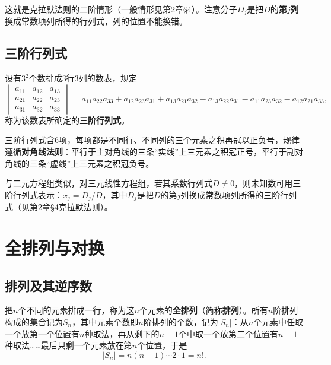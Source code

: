 
这就是克拉默法则的二阶情形（一般情形见第2章§4）。注意分子$D_j$是把$D$的\textbf{第$j$列}换成常数项列所得的行列式，列的位置不能换错。

\subsection{三阶行列式}

\begin{definition}
设有$3^2$个数排成3行3列的数表，规定
\[
\begin{vmatrix}
a_{11}&a_{12}&a_{13}\\
a_{21}&a_{22}&a_{23}\\
a_{31}&a_{32}&a_{33}
\end{vmatrix}
=a_{11}a_{22}a_{33}+a_{12}a_{23}a_{31}+a_{13}a_{21}a_{32}
-a_{13}a_{22}a_{31}-a_{11}a_{23}a_{32}-a_{12}a_{21}a_{33},
\]
称为该数表所确定的\textbf{三阶行列式}。
\end{definition}

三阶行列式含$6$项，每项都是不同行、不同列的三个元素之积再冠以正负号，规律遵循\textbf{对角线法则}：平行于主对角线的三条“实线”上三元素之积冠正号，平行于副对角线的三条“虚线”上三元素之积冠负号。


与二元方程组类似，对三元线性方程组，若其系数行列式$D\neq0$，则未知数可用三阶行列式表示：$x_j=D_j/D$，其中$D_j$是把$D$的第$j$列换成常数项列所得的三阶行列式（见第2章§4克拉默法则）。

\section{全排列与对换}

\subsection{排列及其逆序数}

把$n$个不同的元素排成一行，称为这$n$个元素的\textbf{全排列}（简称\textbf{排列}）。所有$n$阶排列构成的集合记为$S_n$，其中元素个数即$n$阶排列的个数，记为$|S_n|$：从$n$个元素中任取一个放第一个位置有$n$种取法，再从剩下的$n-1$个中取一个放第二个位置有$n-1$种取法……最后只剩一个元素放在第$n$个位置，于是
\[
|S_n|=n(n-1)\cdots 2\cdot 1=n!.
\]

